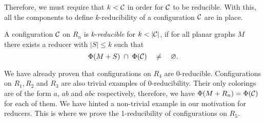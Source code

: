 Therefore, we must require that $k < \mathcal{C}$ in order for $\mathcal{C}$ to be reducible. With this, all the components to define $k$-reducibility of a configuration $\mathcal{C}$ are in place.

\begin{definition}
    A configuration $\mathcal{C}$ on $R_n$ is $k$-\emph{reducible} for $k < |\mathcal{C}|$, if for all planar graphs $M$ there exists a reducer with $|S| \leq k$ such that
    \begin{equation}
        \Phi(M+S)\; \cap\; \Phi(\mathcal{C}) \quad \neq  \quad\varnothing.
    \end{equation}
\end{definition}

We have already proven that configurations on $R_4$ are 0-reducible. Configurations on $R_1, R_2$ and $R_3$ are also trivial examples of 0-reducibility. Their only colorings are of the form $a$, $ab$ and $abc$ respectively, therefore, we have $\Phi(M+R_n) = \Phi(\mathcal{C})$ for each of them. We have hinted a non-trivial example in our motivation for reducers. This is where we prove the 1-reducibility of configurations on $R_5$. 